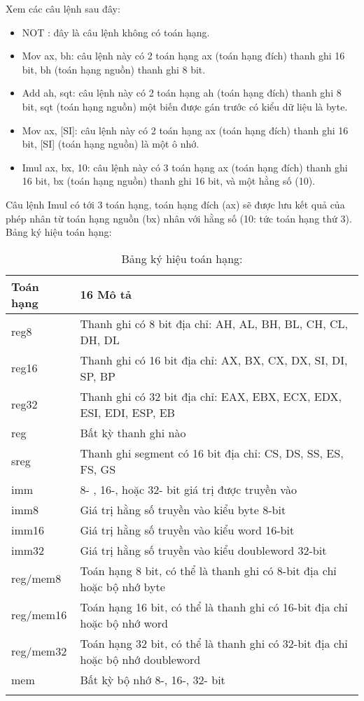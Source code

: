 	Xem các câu lệnh sau đây:
	\begin{itemize}
	\renewcommand{\labelitemi}{\textbullet}		
	\item  NOT	: đây là câu lệnh không có toán hạng.
	\item	Mov ax, bh: câu lệnh này có 2 toán hạng ax (toán hạng đích) thanh ghi 16 bit, bh (toán hạng nguồn) thanh ghi 8 bit.
	\item	Add ah, sqt: câu lệnh này có 2 toán hạng ah (toán hạng đích) thanh ghi 8 bit, sqt (toán hạng nguồn) một biến được gán trước có kiểu dữ liệu là byte.
	\item	Mov ax, [SI]: câu lệnh này có 2 toán hạng ax (toán hạng đích) thanh ghi 16 bit, [SI] (toán hạng nguồn) là một ô nhớ.
	\item	Imul ax, bx, 10: câu lệnh này có 3 toán hạng ax (toán hạng đích) thanh ghi 16 bit, bx (toán hạng nguồn) thanh ghi 16 bit, và một hằng số (10).
	\end{itemize}

	Câu lệnh Imul có tới 3 toán hạng, toán hạng đích (ax) sẽ được lưu kết quả của phép nhân từ toán hạng nguồn (bx) nhân với hằng số (10: tức toán hạng thứ 3).\\
	Bảng ký hiệu toán hạng:
	\begin{longtable}{ | m{3cm} | m{12cm} | }
			\hline
				Toán hạng & 16 Mô tả\\
			\hline
			\hline
				reg8 & Thanh ghi có 8 bit địa chỉ: AH, AL, BH, BL, CH, CL, DH, DL \\
			\hline			
				reg16& Thanh ghi có 16 bit địa chỉ: AX, BX, CX, DX, SI, DI, SP, BP\\
			\hline		
				reg32& Thanh ghi có 32 bit địa chỉ: EAX, EBX, ECX, EDX, ESI, EDI, ESP, EB\\
			\hline	
				reg&	Bất kỳ thanh ghi nào\\
			\hline	
				sreg & Thanh ghi segment có 16 bit địa chỉ: CS, DS, SS, ES, FS, GS\\
			\hline	
				imm	&8- , 16-, hoặc 32- bit giá trị được truyền vào\\
			\hline	
				imm8	& Giá trị hằng số truyền vào kiểu byte 8-bit\\
			\hline	
				imm16	& Giá trị hằng số truyền vào kiểu word 16-bit\\
			\hline	
				imm32&	Giá trị hằng số truyền vào kiểu doubleword 32-bit\\
			\hline	
				reg/mem8& Toán hạng 8 bit, có thể là thanh ghi có 8-bit địa chỉ hoặc bộ nhớ byte\\
			\hline	
				reg/mem16&	Toán hạng 16 bit, có thể là thanh ghi có 16-bit địa chỉ hoặc bộ nhớ word\\
			\hline	
				reg/mem32	& Toán hạng 32 bit, có thể là thanh ghi có 32-bit địa chỉ hoặc bộ nhớ doubleword\\
			\hline	
				mem	& Bất kỳ bộ nhớ 8-, 16-, 32- bit\\
		\hline	
			\caption{Bảng ký hiệu toán hạng:}
			\label{table:tbkyhieu}
	\end{longtable}
	
